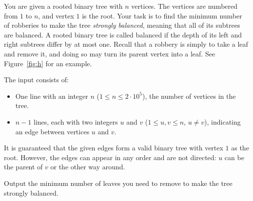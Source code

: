 You are given a rooted binary tree with $n$ vertices. The vertices are numbered from $1$ to $n$,
and vertex $1$ is the root. Your task is to find the minimum number of robberies to make the tree
\textit{strongly balanced}, meaning that all of its subtrees are balanced. A rooted
binary tree is called balanced if the depth of its left and right subtrees differ by at most one.
Recall that a robbery is simply to take a leaf and remove it, and doing so may
turn its parent vertex into a leaf. See Figure~\ref{fig:h} for an example.

\clearpage
\begin{Input}
  The input consists of:
  \begin{itemize}
    \item One line with an integer $n$ ($1 \leq n \leq 2 \cdot 10^5$), the number of vertices in the tree.
    \item $n-1$ lines, each with two integers $u$ and $v$
          ($1 \leq u, v \leq n$, $u\neq v$), indicating an edge between vertices $u$ and $v$.
  \end{itemize}

  It is guaranteed that the given edges form a valid binary tree with vertex $1$ as the root. However,
  the edges can appear in any order and are not directed: $u$ can be the parent of $v$ or the other way around.
\end{Input}

\begin{Output}
  Output the minimum number of leaves you need to remove to make the tree strongly balanced.
\end{Output}
